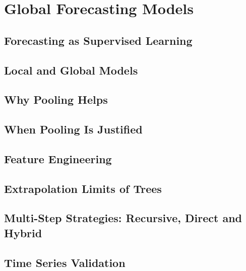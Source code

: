 \chapter{Global Forecasting Models}
\label{ch:global}

\section{Forecasting as Supervised Learning}

\section{Local and Global Models}

\section{Why Pooling Helps}

\section{When Pooling Is Justified}

\section{Feature Engineering}

\section{Extrapolation Limits of Trees}

\section{Multi-Step Strategies: Recursive, Direct and Hybrid}

\section{Time Series Validation}

